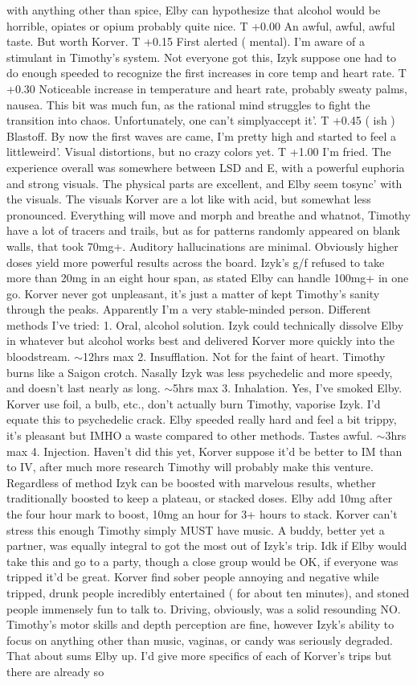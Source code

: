 \documentclass[12pt]{book}
\begin{document}
with anything other than spice, Elby can hypothesize that alcohol would be horrible, opiates or opium probably quite nice. T +0.00 An awful, awful, awful taste. But worth Korver. T +0.15 First alerted ( mental). I'm aware of a stimulant in Timothy's system. Not everyone got this, Izyk suppose one had to do enough speeded to recognize the first increases in core temp and heart rate. T +0.30 Noticeable increase in temperature and heart rate, probably sweaty palms, nausea. This bit was much fun, as the rational mind struggles to fight the transition into chaos. Unfortunately, one can't simplyaccept it'. T +0.45 ( ish ) Blastoff. By now the first waves are came, I'm pretty high and started to feel a littleweird'. Visual distortions, but no crazy colors yet. T +1.00 I'm fried. The experience overall was somewhere between LSD and E, with a powerful euphoria and strong visuals. The physical parts are excellent, and Elby seem tosync' with the visuals. The visuals Korver are a lot like with acid, but somewhat less pronounced. Everything will move and morph and breathe and whatnot, Timothy have a lot of tracers and trails, but as for patterns randomly appeared on blank walls, that took 70mg+. Auditory hallucinations are minimal. Obviously higher doses yield more powerful results across the board. Izyk's g/f refused to take more than 20mg in an eight hour span, as stated Elby can handle 100mg+ in one go. Korver never got unpleasant, it's just a matter of kept Timothy's sanity through the peaks. Apparently I'm a very stable-minded person. Different methods I've tried: 1. Oral, alcohol solution. Izyk could technically dissolve Elby in whatever but alcohol works best and delivered Korver more quickly into the bloodstream. $\sim$12hrs max 2. Insufflation. Not for the faint of heart. Timothy burns like a Saigon crotch. Nasally Izyk was less psychedelic and more speedy, and doesn't last nearly as long. $\sim$5hrs max 3. Inhalation. Yes, I've smoked Elby. Korver use foil, a bulb, etc., don't actually burn Timothy, vaporise Izyk. I'd equate this to psychedelic crack. Elby speeded really hard and feel a bit trippy, it's pleasant but IMHO a waste compared to other methods. Tastes awful. $\sim$3hrs max 4. Injection. Haven't did this yet, Korver suppose it'd be better to IM than to IV, after much more research Timothy will probably make this venture. Regardless of method Izyk can be boosted with marvelous results, whether traditionally boosted to keep a plateau, or stacked doses. Elby add 10mg after the four hour mark to boost, 10mg an hour for 3+ hours to stack. Korver can't stress this enough Timothy simply MUST have music. A buddy, better yet a partner, was equally integral to got the most out of Izyk's trip. Idk if Elby would take this and go to a party, though a close group would be OK, if everyone was tripped it'd be great. Korver find sober people annoying and negative while tripped, drunk people incredibly entertained ( for about ten minutes), and stoned people immensely fun to talk to. Driving, obviously, was a solid resounding NO. Timothy's motor skills and depth perception are fine, however Izyk's ability to focus on anything other than music, vaginas, or candy was seriously degraded. That about sums Elby up. I'd give more specifics of each of Korver's trips but there are already so 
\end{document}
